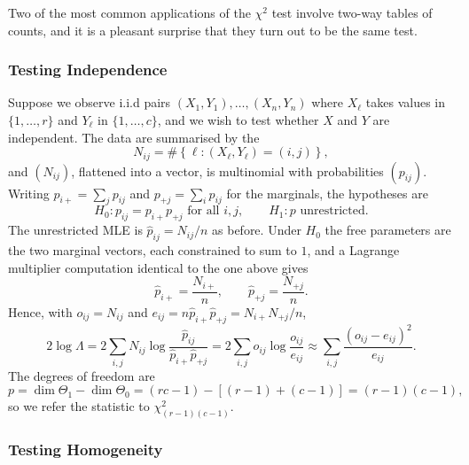 Two of the most common applications of the $\chi^2$ test involve two-way tables of counts, and it is a pleasant surprise that they turn out to be the same test.

\subsubsection{Testing Independence}

Suppose we observe i.i.d pairs $(X_1,Y_1),\dots,(X_n,Y_n)$ where $X_\ell$ takes values in $\{1,\dots,r\}$ and $Y_\ell$ in $\{1,\dots,c\}$, and we wish to test whether $X$ and $Y$ are independent. The data are summarised by the 
$$
N_{ij} = \#\left\{\ell : (X_\ell,Y_\ell) = (i,j)\right\},
$$
and $(N_{ij})$, flattened into a vector, is multinomial with probabilities $(p_{ij})$. Writing $p_{i+} = \sum_j p_{ij}$ and $p_{+j} = \sum_i p_{ij}$ for the marginals, the hypotheses are
$$
H_0 : p_{ij} = p_{i+}p_{+j} \text{ for all } i,j, \qquad H_1 : p \text{ unrestricted}.
$$
The unrestricted MLE is $\hat p_{ij} = N_{ij}/n$ as before. Under $H_0$ the free parameters are the two marginal vectors, each constrained to sum to $1$, and a Lagrange multiplier computation identical to the one above gives
$$
\hat p_{i+} = \frac{N_{i+}}{n}, \qquad \hat p_{+j} = \frac{N_{+j}}{n}.
$$
Hence, with $o_{ij} = N_{ij}$ and $e_{ij} = n\hat p_{i+}\hat p_{+j} = N_{i+}N_{+j}/n$,
$$
2\log\Lambda = 2\sum_{i,j}N_{ij}\log\frac{\hat p_{ij}}{\hat p_{i+}\hat p_{+j}} = 2\sum_{i,j}o_{ij}\log\frac{o_{ij}}{e_{ij}} \approx \sum_{i,j}\frac{(o_{ij}-e_{ij})^2}{e_{ij}}.
$$
The degrees of freedom are
$$
p = \dim\Theta_1 - \dim\Theta_0 = (rc - 1) - \left[(r-1)+(c-1)\right] = (r-1)(c-1),
$$
so we refer the statistic to $\chi^2_{(r-1)(c-1)}$.

\subsubsection{Testing Homogeneity}

